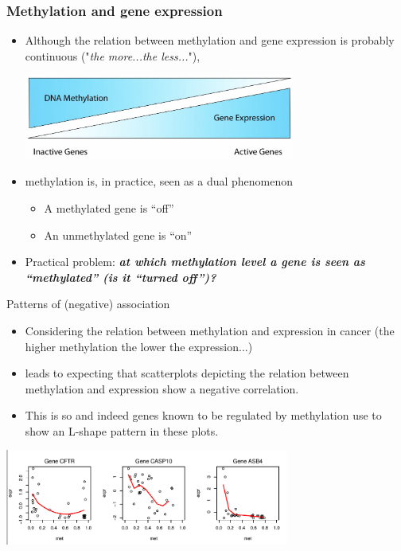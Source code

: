 \documentclass[handout]{beamer}
\begin{document}
\begin{frame}[fragile]\frametitle{Methylation and gene expression}
\begin{itemize}
\item Although the relation between methylation and gene expression is probably continuous ("\emph{the more...the less...}"),
\begin{center}
\includegraphics[width=0.7\textwidth]{./images/DNA-Methylation-and-Gene-Expression-Relationship.jpg}
\end{center}
\item methylation is, in practice, seen as a dual phenomenon
\begin{itemize}
\item A methylated gene is ``off''
\item An unmethylated gene is ``on''
\end{itemize}
\item Practical problem: \textbf{\emph{at which methylation level a gene is seen as ``methylated'' (is it ``turned off'')?}}
\end{itemize}

\end{frame}


\begin{frame}{Patterns of (negative) association}
  \begin{itemize}
  \item Considering the relation between methylation and expression in cancer (the higher methylation the lower the expression...)
\item leads to expecting that scatterplots depicting the relation between methylation and expression show a negative correlation.
\item This is so and indeed genes known to be regulated by methylation use to show an L-shape pattern in these plots.
  \end{itemize}
\begin{center}
\includegraphics[width=0.7\textwidth]{./images/Lshapes1.png}
\end{center}
\end{frame}
\end{document}
